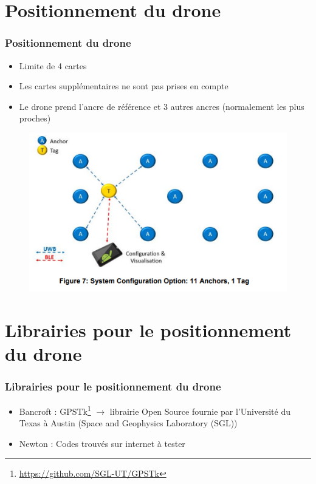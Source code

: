 \documentclass[12pt]{beamer}
\begin{document}
	\section{Positionnement du drone}	
	\begin{frame}[allowframebreaks]
    	\frametitle{Positionnement du drone}
    	    \begin{block}{}
				\begin{itemize}
    	        [triangle]
				    \item Limite de 4 cartes
				    \item Les cartes supplémentaires ne sont pas prises en compte
				    \item Le drone prend l'ancre de référence et 3 autres ancres (normalement les plus proches)
				\end{itemize}
			\end{block}
			
			\begin{figure}[H]
				\centering
				\includegraphics[scale=0.5]{ancres11.png}
			\end{figure}
	\end{frame}
	\section{Librairies pour le positionnement du drone}	
	\begin{frame}[allowframebreaks]
    	\frametitle{Librairies pour le positionnement du drone}
    	    \begin{block}{}
				\begin{itemize}
    	        [triangle]
				    \item Bancroft : GPSTk\footnote{\url{https://github.com/SGL-UT/GPSTk}} $\rightarrow$ librairie Open Source fournie par l'Université du Texas à Austin (Space and Geophysics Laboratory (SGL))
				    \item Newton : Codes trouvés sur internet à tester
				\end{itemize}
			\end{block}
	\end{frame}
\end{document}
